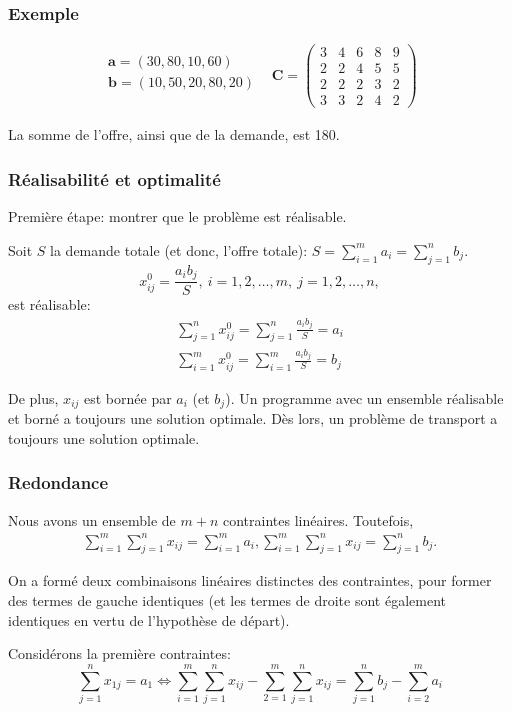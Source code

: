 \documentclass[usepdftitle=false]{beamer}
\def\ba{\boldsymbol{a}}
\def\bb{\boldsymbol{b}}
\def\bC{\boldsymbol{C}}
\begin{document}
\begin{frame}
\frametitle{Exemple}

\[
\begin{matrix}
\begin{matrix}
\ba = (30, 80, 10, 60) \\
\bb = (10, 50, 20, 80, 20) \\
\end{matrix}
&
\bC = 
\begin{pmatrix}
3 & 4 & 6 & 8 & 9 \\
2 & 2 & 4 & 5 & 5 \\
2 & 2 & 2 & 3 & 2 \\
3 & 3 & 2 & 4 & 2
\end{pmatrix}
\end{matrix}
\]

\mbox{}

La somme de l'offre, ainsi que de la demande, est 180.

\end{frame}

\begin{frame}
\frametitle{Réalisabilité et optimalité}

Première étape: montrer que le problème est réalisable.

\mbox{}

Soit $S$ la demande totale (et donc, l'offre totale): $S = \sum_{i = 1}^m a_i = \sum_{j = 1}^n b_j$.
\[
x^0_{ij} = \frac{a_ib_j}{S},\ i=1,2,\ldots,m,\ j = 1,2,\ldots,n,
\]
est réalisable:
\begin{align*}
\sum_{j = 1}^n x^0_{ij} = \sum_{j = 1}^n \frac{a_ib_j}{S} = a_i \\
\sum_{i = 1}^m x^0_{ij} = \sum_{i = 1}^m \frac{a_ib_j}{S} = b_j
\end{align*}

\mbox{}

De plus, $x_{ij}$ est bornée par $a_i$ (et $b_j$).
Un programme avec un ensemble réalisable et borné a toujours une solution optimale. Dès lors, un problème de transport a toujours une solution optimale.

\end{frame}

\begin{frame}
\frametitle{Redondance}

Nous avons un ensemble de $m+n$ contraintes linéaires. Toutefois,
\begin{align*}
\sum_{i = 1}^m \sum_{j = 1}^n x_{ij} = \sum_{i = 1}^m a_i,
\sum_{i = 1}^m \sum_{j = 1}^n x_{ij} = \sum_{j = 1}^n b_j.
\end{align*}

\mbox{}

On a formé deux combinaisons linéaires distinctes des contraintes, pour former des termes de gauche identiques (et les termes de droite sont également identiques en vertu de l'hypothèse de départ).

\mbox{}

Considérons la première contraintes:
\[
\sum_{j = 1}^n x_{1j} = a_1
\Leftrightarrow
\sum_{i = 1}^m \sum_{j = 1}^n x_{ij} - 
\sum_{2 = 1}^m \sum_{j = 1}^n x_{ij}
= \sum_{j =1}^n b_j - \sum_{i = 2}^m a_i
\]

\end{frame}
\end{document}
